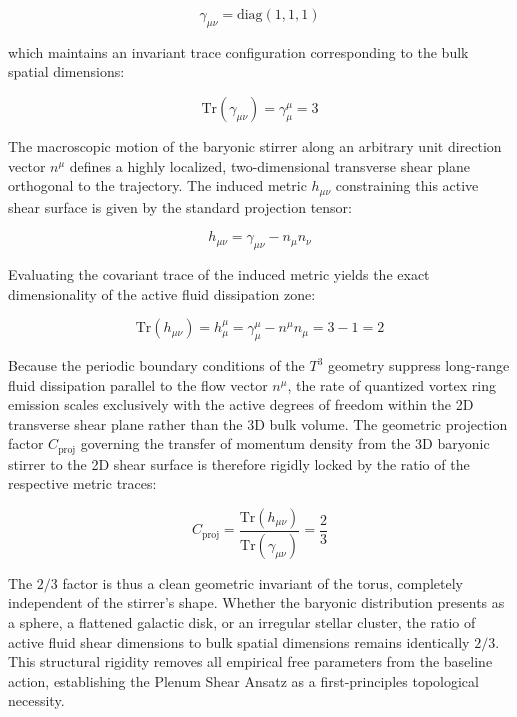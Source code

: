 \documentclass[aps,prd,10pt,twocolumn,superscriptaddress,nofootinbib,floatfix]{revtex4-2}
\begin{document}
\begin{equation}
\gamma_{\mu\nu} = \text{diag}(1, 1, 1)
\end{equation}

which maintains an invariant trace configuration corresponding to the bulk spatial dimensions:

\begin{equation}
\text{Tr}(\gamma_{\mu\nu}) = \gamma^\mu_\mu = 3
\end{equation}

The macroscopic motion of the baryonic stirrer along an arbitrary unit direction vector $n^\mu$ defines a highly localized, two-dimensional transverse shear plane orthogonal to the trajectory. The induced metric $h_{\mu\nu}$ constraining this active shear surface is given by the standard projection tensor:

\begin{equation}
h_{\mu\nu} = \gamma_{\mu\nu} - n_{\mu}n_{\nu}
\end{equation}

Evaluating the covariant trace of the induced metric yields the exact dimensionality of the active fluid dissipation zone:

\begin{equation}
\text{Tr}(h_{\mu\nu}) = h^\mu_\mu = \gamma^\mu_\mu - n^\mu n_\mu = 3 - 1 = 2
\end{equation}

Because the periodic boundary conditions of the $T^3$ geometry suppress long-range fluid dissipation parallel to the flow vector $n^\mu$, the rate of quantized vortex ring emission scales exclusively with the active degrees of freedom within the 2D transverse shear plane rather than the 3D bulk volume. The geometric projection factor $C_{\text{proj}}$ governing the transfer of momentum density from the 3D baryonic stirrer to the 2D shear surface is therefore rigidly locked by the ratio of the respective metric traces:

\begin{equation}
C_{\text{proj}} = \frac{\text{Tr}(h_{\mu\nu})}{\text{Tr}(\gamma_{\mu\nu})} = \frac{2}{3}
\end{equation}

The $2/3$ factor is thus a clean geometric invariant of the torus, completely independent of the stirrer's shape. Whether the baryonic distribution presents as a sphere, a flattened galactic disk, or an irregular stellar cluster, the ratio of active fluid shear dimensions to bulk spatial dimensions remains identically $2/3$. This structural rigidity removes all empirical free parameters from the baseline action, establishing the Plenum Shear Ansatz as a first-principles topological necessity.
\end{document}
